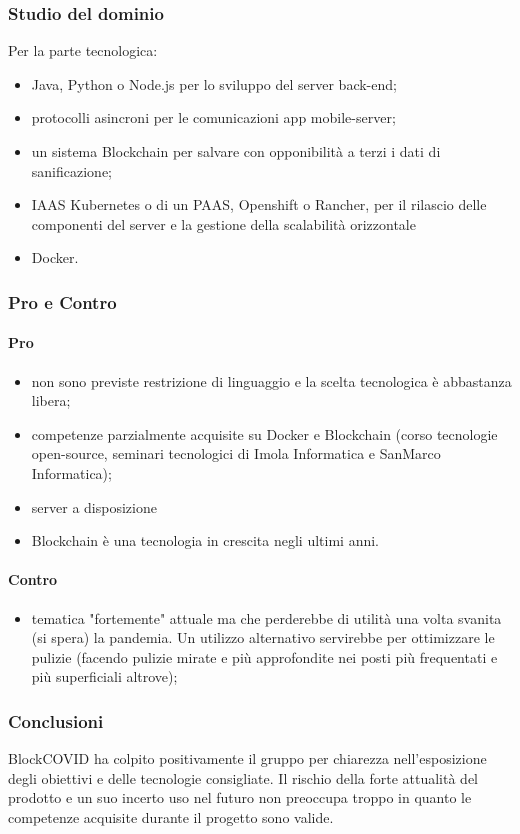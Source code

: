 \subsubsection{Studio del dominio}
Per la parte tecnologica:
\begin{itemize}
\item Java, Python o Node.js per lo sviluppo del server back-end;
\item protocolli asincroni per le comunicazioni app mobile-server;
\item un sistema Blockchain per salvare con opponibilità a terzi i dati di sanificazione;
\item IAAS Kubernetes o di un PAAS, Openshift o Rancher, per il rilascio delle componenti del server e la gestione della scalabilità orizzontale
\item Docker.
\end{itemize}
\subsubsection{Pro e Contro}
\paragraph*{Pro}
\begin{itemize}
	\item non sono previste restrizione di linguaggio e la scelta tecnologica è abbastanza libera;
	\item competenze parzialmente acquisite su Docker e Blockchain (corso tecnologie open-source, seminari tecnologici di Imola Informatica e SanMarco Informatica);
	\item server a disposizione 
	\item Blockchain è una tecnologia in crescita negli ultimi anni.
\end{itemize}
\paragraph*{Contro}
\begin{itemize}
	\item tematica "fortemente" attuale ma che perderebbe di utilità una volta svanita (si spera) la pandemia. Un utilizzo alternativo servirebbe per ottimizzare le pulizie (facendo pulizie mirate e più approfondite nei posti più frequentati e più superficiali altrove);
\end{itemize}
\subsubsection{Conclusioni}
BlockCOVID ha colpito positivamente il gruppo per chiarezza nell'esposizione degli obiettivi e delle tecnologie consigliate. Il rischio della forte attualità del prodotto e un suo incerto uso nel futuro non preoccupa troppo in quanto le competenze acquisite durante il progetto sono valide.

